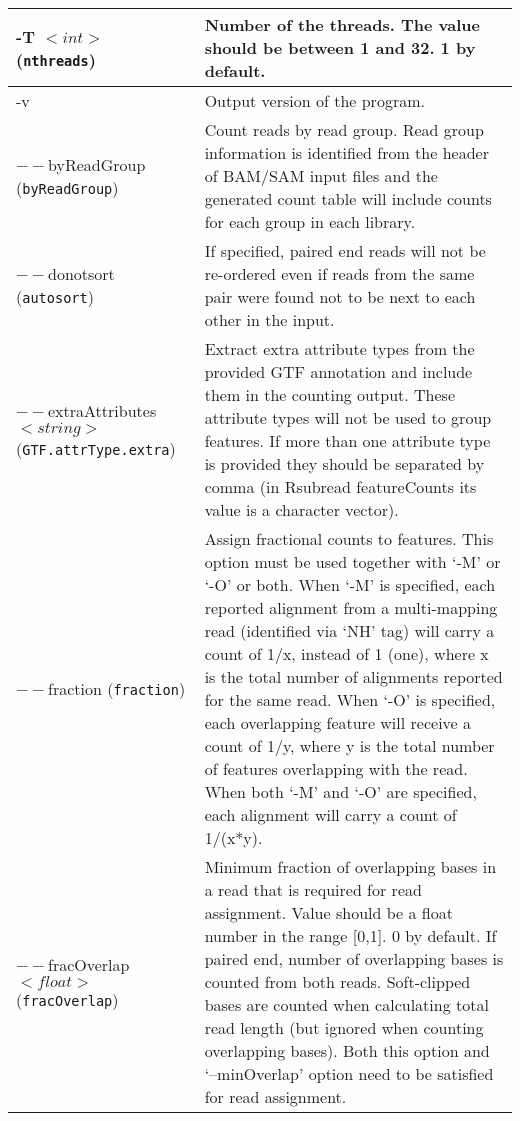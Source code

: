 \documentclass[12pt]{report}
\newcommand{\code}[1]{{\small\texttt{#1}}}
\newcommand{\Rsubread}{\textsf{Rsubread}}
\newcommand{\featureCounts}{\textsf{featureCounts}}
\begin{document}
\begin{longtable}{|p{5cm}|p{11cm}|}
\hline
-T $<int>$ \newline (\code{nthreads}) & Number of the threads. The value should be between 1 and 32. 1 by default.\\
\hline
-v & Output version of the program. \\
\hline
$--$byReadGroup \newline (\code{byReadGroup}) & Count reads by read group. Read group information is identified from the header of BAM/SAM input files and the generated count table will include counts for each group in each library.\\
\hline
$--$donotsort \newline (\code{autosort}) & If specified, paired end reads will not be re-ordered even if reads from the same pair were found not to be next to each other in the input.\\
\hline
$--$extraAttributes $<string>$ \newline (\code{GTF.attrType.extra}) & Extract extra attribute types from the provided GTF annotation and include them in the counting output. These attribute types will not be used to group features. If more than one attribute type is provided they should be separated by comma (in {\Rsubread} {\featureCounts} its value is a character vector).  \\
\hline
$--$fraction \newline (\code{fraction}) & Assign fractional counts to features. This option must be used together with `-M' or `-O' or both. When `-M' is specified, each reported alignment from a multi-mapping read (identified via `NH' tag) will carry a count of 1/x, instead of 1 (one), where x is the total number of alignments reported for the same read. When `-O' is specified, each overlapping feature will receive a count of 1/y, where y is the total number of features overlapping with the read. When both `-M' and `-O' are specified, each alignment will carry a count of 1/(x*y).\\
\hline
$--$fracOverlap $<float>$ \newline (\code{fracOverlap}) & Minimum fraction of overlapping bases in a read that is required for read assignment. Value should be a float number in the range [0,1]. 0 by default. If paired end, number of overlapping bases is counted from both reads. Soft-clipped bases are counted when calculating total read length (but ignored when counting overlapping bases). Both this option and `--minOverlap' option need to be satisfied for read assignment. \\
\hline

\end{longtable}
\end{document}
